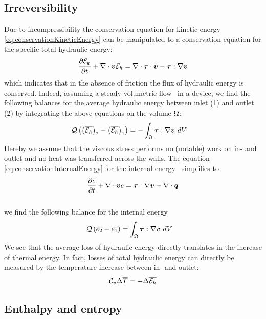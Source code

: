 \subsection{Irreversibility} 

Due to incompressibility the conservation equation for kinetic energy
\ref{eq:conservationKineticEnergy} can be manipulated to a
conservation equation for the specific total hydraulic energy:
\begin{equation}
  \frac{\partial \mathcal E_k}{\partial t}  + 
  \nabla \cdot \boldsymbol {v} \mathcal E_h =
  \nabla \cdot \boldsymbol {\tau} \cdot \boldsymbol {v} - \boldsymbol {\tau} : \nabla \boldsymbol {v} 
  \label{eq:conservationHydraulicEnergy}
\end{equation}
which indicates that in the absence of friction the flux of hydraulic
energy is conserved. Indeed, assuming a steady volumetric flow
\vFlow~in a device, we find the following balances for the average
hydraulic energy between inlet (1) and outlet (2) by integrating the
above equations on the volume $\Omega$:
\begin{align*}
  \mathcal Q \left(\left(\overline{\mathcal E_h}\right)_2 - \left(\overline{\mathcal E_h}\right)_1\right) &
  = - \int_{\Omega} \boldsymbol {\tau} : \nabla \boldsymbol {v}~dV 
\end{align*}
Hereby we assume that the viscous stress performs no (notable) work on
in- and outlet and no heat was transferred across the walls.  The
equation \ref{eq:conservationInternalEnergy} for the internal energy
\ener~simplifies to
\begin{equation}
  \frac{\partial e}{\partial t} + \nabla \cdot \boldsymbol {v} e = 
  \boldsymbol {\tau} : \nabla \boldsymbol {v} + \nabla \cdot \boldsymbol {q} 
\end{equation}\\
we find the following balance for the internal energy
\begin{align*}
  \mathcal Q \left(\overline{e_2} - \overline{e_1}\right) &
  = \int_{\Omega} \boldsymbol {\tau} : \nabla \boldsymbol {v}~dV 
\end{align*}
We see that the average loss of hydraulic energy directly translates
in the increase of thermal energy. In fact, losses of total hydraulic
energy can directly be measured by the temperature increase between
in- and outlet:
\begin{align*}
  \mathcal C_v \Delta \overline{T} = - \Delta \overline{\mathcal E_h}
\end{align*}

\subsection{Enthalpy and entropy}

